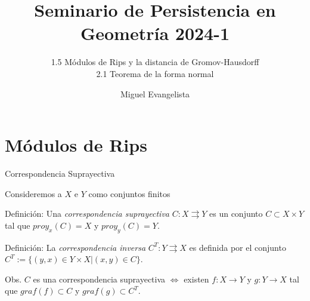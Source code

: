 \documentclass{beamer}
\title{Seminario de Persistencia en Geometría 2024-1}
\subtitle{1.5 Módulos de Rips y la distancia de Gromov-Hausdorff \\ 2.1 Teorema de la forma normal} %
\author{Miguel Evangelista}
\begin{document}
\frenchspacing


  \frame{\maketitle}


\section{Módulos de Rips}
%

\begin{frame}{Correspondencia Suprayectiva}

    Consideremos a $X$ e $Y$ como conjuntos finitos
    
    \begin{block}{Definición:}
        Una \textit{correspondencia suprayectiva} $C: X \rightrightarrows Y $ es un conjunto $C \subset X \times Y$ tal que $proy_{x}(C) = X$ y $proy_{y}(C) = Y$.
    \end{block}
    \pause

    \begin{block}{Definición:}
        La \textit{correspondencia inversa} $C^{T}: Y \rightrightarrows X$ es definida por el conjunto $C^{T}:=\{(y,x)\in Y \times X | (x,y) \in C \}$.
    \end{block}
    \pause

    \begin{block}{Obs.}
        $C$ es una correspondencia suprayectiva $\Leftrightarrow$ existen $f:X\to Y$ y $g:Y\to X$ tal que $graf(f) \subset C$ y $graf(g) \subset C^{T}$.
    \end{block}
\end{frame}
\end{document}
